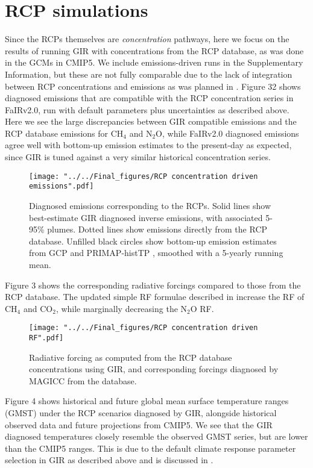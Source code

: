 \documentclass[gmd, manuscript]{copernicus}
\begin{document}
\section*{RCP simulations}
Since the RCPs themselves are \emph{concentration} pathways, here we focus on the results of running GIR with concentrations from the RCP database, as was done in the GCMs in CMIP5. We include emissions-driven runs in the Supplementary Information, but these are not fully comparable due to the lack of integration between RCP concentrations and emissions as was planned in \cite{Moss2010}. Figure 32 shows diagnosed emissions that are compatible with the RCP concentration series in FaIRv2.0, run with default parameters plus uncertainties as described above. Here we see the large discrepancies between GIR compatible emissions and the RCP database emissions for CH$_4$ and N$_2$O, while FaIRv2.0 diagnosed emissions agree well with bottom-up emission estimates to the present-day as expected, since GIR is tuned against a very similar historical concentration series.
\begin{figure}[t]
    \texttt{[image: "../../Final\_figures/RCP concentration driven emissions".pdf]}
    \caption{Diagnosed emissions corresponding to the RCPs. Solid lines show best-estimate GIR diagnosed inverse emissions, with associated 5-95\% plumes. Dotted lines show emissions directly from the RCP database. Unfilled black circles show bottom-up emission estimates from GCP and PRIMAP-histTP \citep{Quere2018,Gutschow2016}, smoothed with a 5-yearly running mean.}
\end{figure}
Figure 3 shows the corresponding radiative forcings compared to those from the RCP database. The updated simple RF formulae described in \cite{Etminan2016} increase the RF of CH$_4$ and CO$_2$, while marginally decreasing the N$_2$O RF.
\begin{figure}[t]
    \texttt{[image: "../../Final\_figures/RCP concentration driven RF".pdf]}
    \caption{Radiative forcing as computed from the RCP database concentrations using GIR, and corresponding forcings diagnosed by MAGICC from the database.}
\end{figure}
Figure 4 shows historical and future global mean surface temperature ranges (GMST) under the RCP scenarios diagnosed by GIR, alongside historical observed data and future projections from CMIP5. We see that the GIR diagnosed temperatures closely resemble the observed GMST series, but are lower than the CMIP5 ranges. This is due to the default climate response parameter selection in GIR as described above and is discussed in \cite{Richardson2016}.
\end{document}

